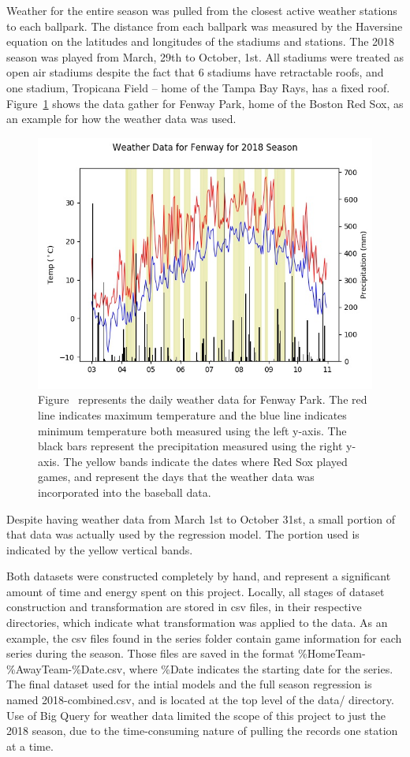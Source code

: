 \documentclass{article}
\begin{document}
Weather for the entire season was pulled from the closest active weather
stations to each ballpark.
The distance from each ballpark was measured by the Haversine equation on 
the latitudes and longitudes of the stadiums and stations.
The 2018 season was played from March, 29th to October, 1st.
All stadiums were treated as open air stadiums despite the fact that
6 stadiums have retractable roofs,
and one stadium,
Tropicana Field -- home of the Tampa Bay Rays,
has a fixed roof. 
Figure~\ref{Fig:Weather} shows the data gather for Fenway Park,
home of the Boston Red Sox,
as an example for how the weather data was used.
\begin{figure}[ht]
    \centering
    \includegraphics[width=.8\textwidth]{weather-example.jpg}
    \caption{Figure~\label{Fig:Weather} represents the daily weather data for
    Fenway Park.  The red line indicates maximum temperature and the blue
    line indicates minimum temperature both measured using the left y-axis.
    The black bars represent the precipitation measured using the right y-axis.
    The yellow bands indicate the dates where Red Sox played games,
    and represent the days that the weather data was incorporated into the
    baseball data.}
\end{figure}
Despite having weather data from March 1st to October 31st,
a small portion of that data was actually used by the regression model.
The portion used is indicated by the yellow vertical bands. \par

Both datasets were constructed completely by hand,
and represent a significant amount of time and  energy spent on this project.
Locally,
all stages of dataset construction and transformation are stored in csv files,
in their respective directories,
which indicate what transformation was applied to the data.
As an example,
the csv files found in the series folder contain game information for each
series during the season.
Those files are saved in the format \%HomeTeam-\%AwayTeam-\%Date.csv,
where \%Date indicates the starting date for the series.
The final dataset used for the intial models and the full season regression
is named 2018-combined.csv,
and is located at the top level of the data/ directory.
Use of Big Query for weather data limited the scope of this project to just
the 2018 season,
due to the time-consuming nature of pulling the records one station at a time.
\end{document}
